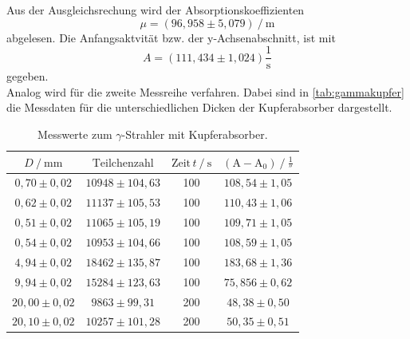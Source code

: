 Aus der Ausgleichsrechung wird der Absorptionskoeffizienten 
\begin{equation*}
    \mu =  \left( 96,958 \pm 5,079 \right) \mathbin{/} \unit{\meter}
\end{equation*}
abgelesen. 
Die Anfangsaktvität bzw. der y-Achsenabschnitt, ist mit 
\begin{equation*}
    A =  \left( 111,434 \pm 1,024 \right)  \dfrac{1}{\unit{\second}}
\end{equation*}
gegeben. \\

Analog wird für die zweite Messreihe verfahren.
Dabei sind in \autoref{tab:gammakupfer} die Messdaten für die unterschiedlichen Dicken der Kupferabsorber dargestellt.

\begin{table}[H]
    \centering
    \caption{Messwerte zum $\gamma$-Strahler mit Kupferabsorber.}
    \label{tab:gammakupfer}
    \begin{tabular}{S[table-format=2.2] S[table-format=5.0] S[table-format=3.0] S}
      \toprule
      {$D \mathbin{/} \unit{\milli\meter} $} & {$\text{Teilchenzahl}$} & {$\text{Zeit} \,t \mathbin{/} \unit{\second}$} &{$ \left(\text{A}- \text{A}_0 \right) \mathbin{/} \unit{\frac{1}{\second}}$} \\
      \midrule
      {$ 0,70 \pm 0,02$}          &    {$  10948 \pm 104,63    $} &      100  	& {$108,54  \pm 1,05$} \\
      {$ 0,62 \pm 0,02$}          &    {$  11137 \pm 105,53    $} &      100  	& {$110,43  \pm 1,06$} \\
      {$ 0,51 \pm 0,02$}          &    {$  11065 \pm 105,19    $} &      100  	& {$109,71  \pm 1,05$} \\
      {$ 0,54 \pm 0,02$}          &    {$  10953 \pm 104,66    $} &      100  	& {$108,59  \pm 1,05$} \\
      {$ 4,94 \pm 0,02$}          &    {$  18462 \pm 135,87    $} &      100  	& {$183,68  \pm 1,36$} \\
      {$ 9,94 \pm 0,02$}          &    {$  15284 \pm 123,63    $} &      100  	& {$75,856  \pm 0,62$} \\
      {$20,00 \pm 0,02$}          &    {$   9863 \pm 99,31     $} &      200  	& {$ 48,38  \pm 0,50$} \\
      {$20,10 \pm 0,02$}          &    {$  10257 \pm 101,28    $} &      200  	& {$ 50,35  \pm 0,51$} \\
      \bottomrule
    \end{tabular}
  \end{table}

